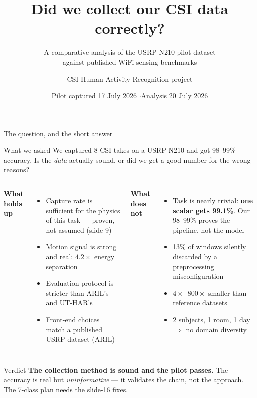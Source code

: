 \documentclass[aspectratio=169,10pt]{beamer}
\title{\bfseries Did we collect our CSI data correctly?}
\subtitle{A comparative analysis of the USRP N210 pilot dataset\\against published WiFi sensing benchmarks}
\author{CSI Human Activity Recognition project}
\date{Pilot captured 17 July 2026 \quad$\cdot$\quad Analysis 20 July 2026}
\newcommand{\gd}[1]{\textcolor{good}{#1}}
\newcommand{\bd}[1]{\textcolor{bad}{#1}}
\begin{document}
\frame{\titlepage}

\begin{frame}{The question, and the short answer}
\begin{block}{\small What we asked}
\small We captured 8 CSI takes on a USRP N210 and got 98--99\% accuracy.
Is the \emph{data} actually sound, or did we get a good number for the wrong reasons?
\end{block}

\vspace{0.2em}
\begin{columns}[T]
\textbf{\gd{What holds up}}
\begin{itemize}\scriptsize
\item Capture rate is \gd{sufficient} for the physics of this task --- proven, not assumed (slide 9)
\item Motion signal is \gd{strong and real}: $4.2\times$ energy separation
\item Evaluation protocol is \gd{stricter} than ARIL's and UT-HAR's
\item Front-end choices \gd{match} a published USRP dataset (ARIL)
\end{itemize}

\textbf{\bd{What does not}}
\begin{itemize}\scriptsize
\item Task is \bd{nearly trivial}: \textbf{one scalar gets 99.1\%}. Our 98--99\% proves the pipeline, not the model
\item \bd{13\% of windows silently discarded} by a preprocessing misconfiguration
\item \bd{$4\times$--$800\times$ smaller} than reference datasets
\item 2 subjects, 1 room, 1 day $\Rightarrow$ \bd{no domain diversity}
\end{itemize}
\end{columns}

\vspace{0.2em}
\begin{block}{\small Verdict}
\small\textbf{The collection method is sound and the pilot passes.}
The accuracy is real but \emph{uninformative} --- it validates the chain, not the approach.
The 7-class plan needs the slide-16 fixes.
\end{block}
\end{frame}
\end{document}

